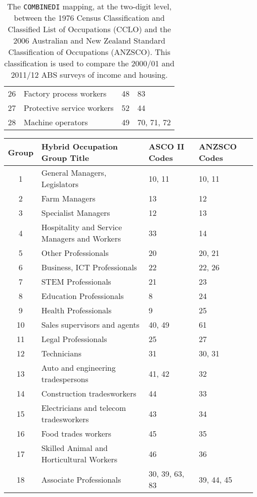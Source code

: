 \begin{sidewaystable}[ht]
\begin{tabular}{clll}
  26 & Factory process workers & 48 & 83 \\ 
  27 & Protective service workers & 52 & 44 \\ 
  28 & Machine operators & 49 & 70, 71, 72 \\ 
   \hline
\end{tabular}
\caption{The {\tt COMBINEDI} mapping, at the two-digit level, between the 1976 Census Classification and Classified List of Occupations (CCLO) and the 2006 Australian and New Zealand Standard Classification of Occupations (ANZSCO). This classification is used to compare the 2000/01 and 2011/12 ABS surveys of income and housing.}
\label{tab:combined1}
\end{sidewaystable}

\begin{sidewaystable}[ht]
\centering
\begin{tabular}{clll}
  \hline
{\bf Group} & {\bf Hybrid Occupation Group Title} & {\bf ASCO II Codes} & {\bf ANZSCO Codes} \\ 
  \hline
  1 & General Managers, Legislators & 10, 11 & 10, 11 \\ 
  2 & Farm Managers & 13 & 12 \\ 
  3 & Specialist Managers & 12 & 13 \\ 
  4 & Hospitality and Service Managers and Workers & 33 & 14 \\ 
  5 & Other Professionals & 20 & 20, 21 \\ 
  6 & Business, ICT Professionals & 22 & 22, 26 \\ 
  7 & STEM Professionals & 21 & 23 \\ 
  8 & Education Professionals & 8 & 24 \\ 
  9 & Health Professionals & 9 & 25 \\ 
  10 & Sales supervisors and agents & 40, 49 & 61 \\ 
  11 & Legal Professionals & 25 & 27 \\ 
  12 & Technicians & 31 & 30, 31 \\ 
  13 & Auto and engineering tradespersons & 41, 42 & 32 \\ 
  14 & Construction tradesworkers & 44 & 33 \\ 
  15 & Electricians and telecom tradesworkers & 43 & 34 \\ 
  16 & Food trades workers & 45 & 35 \\ 
  17 & Skilled Animal and Horticultural Workers & 46 & 36 \\ 
  18 & Associate Professionals & 30, 39, 63, 83 & 39, 44, 45 \\ 

\end{tabular}
\end{sidewaystable}
